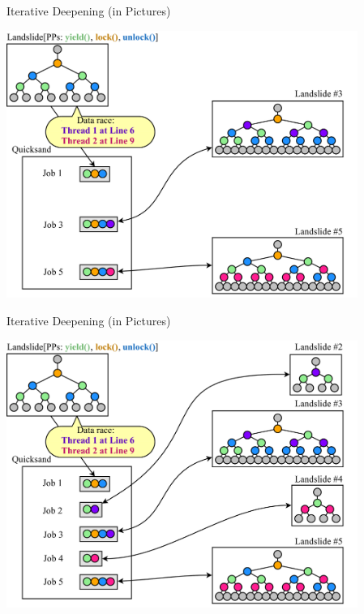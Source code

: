 \documentclass[xcolor=dvipsnames]{beamer}
\begin{document}
\begin{frame}{Iterative Deepening (in Pictures)}
	\begin{center}
	\vspace{-0.88em}
	\includegraphics[width=0.86\textwidth]{../../oopsla/dr-jobs-3.pdf}
	\end{center}
\end{frame}
\begin{frame}{Iterative Deepening (in Pictures)}
	\begin{center}
	\vspace{-0.88em}
	\includegraphics[width=0.86\textwidth]{../../oopsla/dr-jobs-4.pdf}
	\end{center}
\end{frame}
\end{document}
